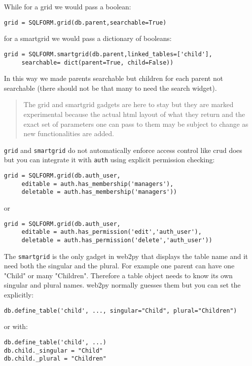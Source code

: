 \documentclass[justified,sixbynine,notoc]{tufte-book}
\def\ft{\small\tt}
\def\inxx#1{\index{#1}}
\begin{document}
\begin{fullwidth}
While for a grid we would pass a boolean:
\begin{lstlisting}
grid = SQLFORM.grid(db.parent,searchable=True)
\end{lstlisting}
\noindent for a smartgrid we would pass a dictionary of booleans:
\begin{lstlisting}
grid = SQLFORM.smartgrid(db.parent,linked_tables=['child'],
     searchable= dict(parent=True, child=False))
\end{lstlisting}

In this way we made parents searchable but children for each parent not searchable (there should not be that many to need the search widget).

\begin{quote}The grid and smartgrid gadgets are here to stay but they are marked experimental because the actual html layout of what they return and the exact set of parameters one can pass to them  may be subject to change as new functionalities are added.\end{quote}
{\ft grid} and {\ft smartgrid} do not automatically enforce access control like crud does but you can integrate it with {\ft auth} using explicit permission checking:

\begin{lstlisting}
grid = SQLFORM.grid(db.auth_user,
     editable = auth.has_membership('managers'),
     deletable = auth.has_membership('managers'))
\end{lstlisting}
\noindent or

\begin{lstlisting}
grid = SQLFORM.grid(db.auth_user,
     editable = auth.has_permission('edit','auth_user'),
     deletable = auth.has_permission('delete','auth_user'))
\end{lstlisting}

The {\ft smartgrid} is the only gadget in web2py that displays the table name and it need both the singular and the plural. For example one parent can have one "Child" or many "Children". Therefore a table object needs to know its own singular and plural names. web2py normally guesses them but you can set the explicitly:

\begin{lstlisting}
db.define_table('child', ..., singular="Child", plural="Children")
\end{lstlisting}
\noindent or with: \inxx{singular} \inxx{plural}

\begin{lstlisting}
db.define_table('child', ...)
db.child._singular = "Child"
db.child._plural = "Children"
\end{lstlisting}


\end{fullwidth}
\end{document}
